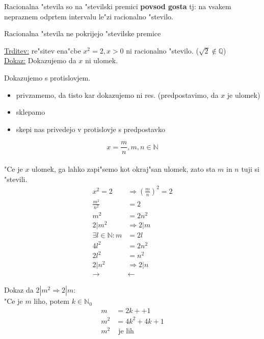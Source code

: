 Racionalna "stevila so na "stevilski premici \textbf{povsod gosta} tj: na vsakem nepraznem odprtem intervalu le"zi racionalno "stevilo.

Racionalna "stevila ne pokrijejo "stevilske premice

\underline{Trditev:} re"sitev ena"cbe \(x^2 = 2, x > 0\) ni racionalno "stevilo. (\(\sqrt{2} \notin \mathbb{Q}\))\\
\underline{Dokaz:} Dokazujemo da \(x\) ni ulomek.

Dokazujemo s protislovjem.
\begin{itemize}
	\item privzamemo, da tisto kar dokazujemo ni res. (predpostavimo, da \(x\) je ulomek)
	\item sklepamo
	\item skepi nas privedejo v protislovje s predpostavko
\end{itemize}
\[x = \frac{m}{n}, m, n \in \mathbb{N}\]\\
"Ce je \(x\) ulomek, ga lahko zapi"semo kot okraj"san ulomek, zato sta \(m\) in \(n\) tuji si "stevili.
\begin{align*}
	x^2 = 2 &\Rightarrow (\frac{m}{n})^2 = 2\\
	\frac{m^2}{n^2} &= 2\\
	m^2 &= 2n^2\\
	2 | m^2 &\Rightarrow 2 | m\\
	\exists l \in \mathbb{N}: m &= 2l\\
	4l^2 &= 2n^2\\
	2l^2 &= n^2\\
	2 | n^2 &\Rightarrow 2 | n\\
	\rightarrow&\leftarrow
\end{align*}

Dokaz da \(2 | m^2 \Rightarrow 2 | m\):\\
"Ce je \(m\) liho, potem \(k \in \mathbb{N}_0\)
\begin{align*}
	m &= 2k+ + 1\\
	m^2 &= 4k^2 + 4k + 1\\
	m^2 &\text{ je lih}
\end{align*}

